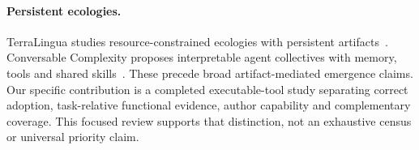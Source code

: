 \paragraph{Persistent ecologies.} TerraLingua studies resource-constrained ecologies with persistent artifacts~\cite{paolo2026terralingua}. Conversable Complexity proposes interpretable agent collectives with memory, tools and shared skills~\cite{najarro2026conversable}. These precede broad artifact-mediated emergence claims. Our specific contribution is a completed executable-tool study separating correct adoption, task-relative functional evidence, author capability and complementary coverage. This focused review supports that distinction, not an exhaustive census or universal priority claim.
